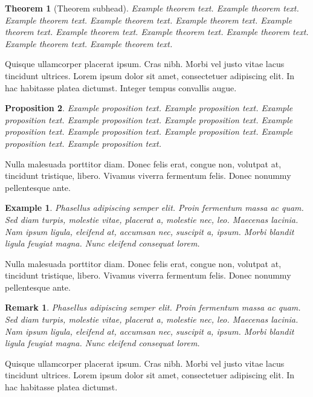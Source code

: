 \documentclass[numbers,webpdf]{ima-authoring-template}%
\theoremstyle{thmstyletwo}%
\newtheorem{theorem}{Theorem}%
\newtheorem{proposition}[theorem]{Proposition}%
\newtheorem{example}{Example}%
\newtheorem{remark}{Remark}%
\numberwithin{equation}{section}
\begin{document}
\begin{theorem}[Theorem subhead]\label{thm1}
Example theorem text. Example theorem text. Example theorem text. Example theorem text. Example theorem text.
Example theorem text. Example theorem text. Example theorem text. Example theorem text. Example theorem text.
Example theorem text.
\end{theorem}

Quisque ullamcorper placerat ipsum. Cras nibh. Morbi vel justo vitae lacus tincidunt ultrices. Lorem ipsum dolor sit
amet, consectetuer adipiscing elit. In hac habitasse platea dictumst. Integer tempus convallis augue.

\begin{proposition}
Example proposition text. Example proposition text. Example proposition text. Example proposition text. Example proposition text.
Example proposition text. Example proposition text. Example proposition text. Example proposition text. Example proposition text.
\end{proposition}

Nulla malesuada porttitor diam. Donec felis erat, congue non, volutpat at, tincidunt tristique, libero. Vivamus
viverra fermentum felis. Donec nonummy pellentesque ante.

\begin{example}
Phasellus adipiscing semper elit. Proin fermentum massa
ac quam. Sed diam turpis, molestie vitae, placerat a, molestie nec, leo. Maecenas lacinia. Nam ipsum ligula, eleifend
at, accumsan nec, suscipit a, ipsum. Morbi blandit ligula feugiat magna. Nunc eleifend consequat lorem.
\end{example}

Nulla malesuada porttitor diam. Donec felis erat, congue non, volutpat at, tincidunt tristique, libero. Vivamus
viverra fermentum felis. Donec nonummy pellentesque ante.

\begin{remark}
Phasellus adipiscing semper elit. Proin fermentum massa
ac quam. Sed diam turpis, molestie vitae, placerat a, molestie nec, leo. Maecenas lacinia. Nam ipsum ligula, eleifend
at, accumsan nec, suscipit a, ipsum. Morbi blandit ligula feugiat magna. Nunc eleifend consequat lorem.
\end{remark}

Quisque ullamcorper placerat ipsum. Cras nibh. Morbi vel justo vitae lacus tincidunt ultrices. Lorem ipsum dolor sit
amet, consectetuer adipiscing elit. In hac habitasse platea dictumst.
\end{document}
